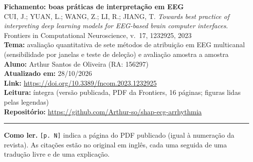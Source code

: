 \documentclass[11pt,a4paper]{article}
\begin{document}
\begin{center}
    {\LARGE \textbf{Fichamento: boas práticas de interpretação em EEG}} \\[0.35em]
    {\large CUI, J.; YUAN, L.; WANG, Z.; LI, R.; JIANG, T. \textit{Towards best practice of interpreting deep learning models for EEG-based brain computer interfaces}. Frontiers in Computational Neuroscience, v.~17, 1232925, 2023} \\[0.3em]
    \textbf{Tema:} avaliação quantitativa de sete métodos de atribuição em EEG multicanal (sensibilidade por janelas e teste de deleção) e avaliação amostra a amostra \\[0.2em]
    \textbf{Aluno:} Arthur Santos de Oliveira (RA: 156297) \\[0.2em]
    \textbf{Atualizado em:} 28/10/2026 \\[0.2em]
    \textbf{Link:} \url{https://doi.org/10.3389/fncom.2023.1232925} \\[0.2em]
    \textbf{Leitura:} íntegra (versão publicada, PDF da Frontiers, 16 páginas; figuras lidas pelas legendas) \\[0.2em]
    \textbf{Repositório:} \url{https://github.com/Arthur-so/shap-ecg-arrhythmia}
\end{center}
\vspace{-0.5em}
\hrule
\vspace{0.8em}

\textbf{Como ler.} \texttt{[p. N]} indica a página do PDF publicado (igual à numeração da revista). As citações estão no original em inglês, cada uma seguida de uma tradução livre e de uma explicação.
\end{document}

